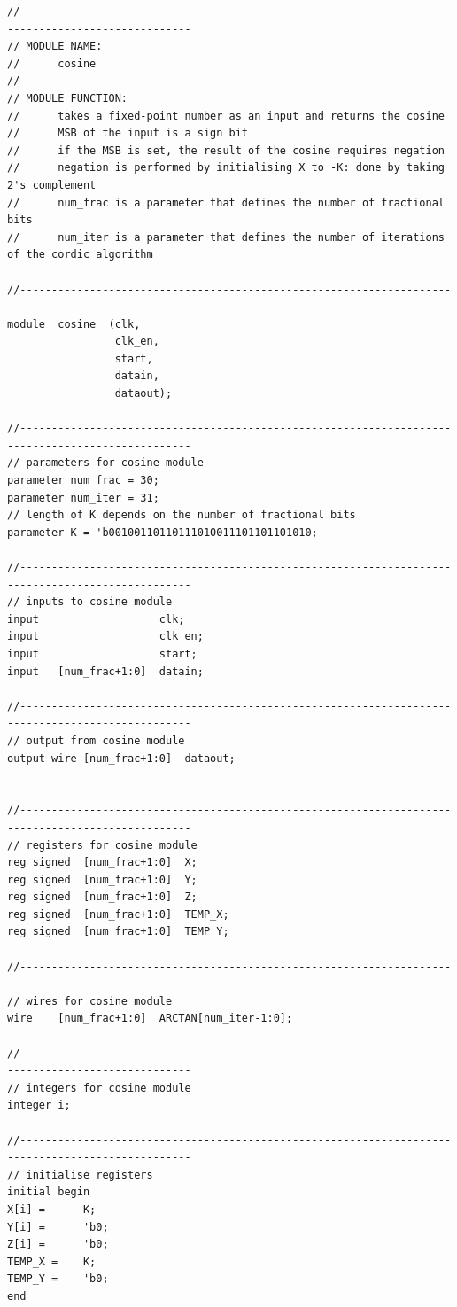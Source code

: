 \documentclass{article}
\begin{document}
\begin{verbatim}
//-------------------------------------------------------------------------------------------------
// MODULE NAME: 
//      cosine
//
// MODULE FUNCTION:
//      takes a fixed-point number as an input and returns the cosine
//      MSB of the input is a sign bit
//      if the MSB is set, the result of the cosine requires negation
//      negation is performed by initialising X to -K: done by taking 2's complement
//      num_frac is a parameter that defines the number of fractional bits
//      num_iter is a parameter that defines the number of iterations of the cordic algorithm

//-------------------------------------------------------------------------------------------------
module  cosine  (clk,
                 clk_en,                
                 start,
                 datain,
                 dataout);

//-------------------------------------------------------------------------------------------------
// parameters for cosine module
parameter num_frac = 30;
parameter num_iter = 31;
// length of K depends on the number of fractional bits
parameter K = 'b00100110110111010011101101101010;

//-------------------------------------------------------------------------------------------------
// inputs to cosine module				
input                   clk;
input                   clk_en;
input                   start;
input   [num_frac+1:0]  datain;

//-------------------------------------------------------------------------------------------------
// output from cosine module
output wire [num_frac+1:0]  dataout;


//-------------------------------------------------------------------------------------------------
// registers for cosine module
reg signed  [num_frac+1:0]  X;
reg signed  [num_frac+1:0]  Y;
reg signed  [num_frac+1:0]  Z;
reg signed  [num_frac+1:0]  TEMP_X;
reg signed  [num_frac+1:0]  TEMP_Y;

//-------------------------------------------------------------------------------------------------
// wires for cosine module
wire    [num_frac+1:0]  ARCTAN[num_iter-1:0];

//-------------------------------------------------------------------------------------------------
// integers for cosine module
integer i;

//-------------------------------------------------------------------------------------------------
// initialise registers
initial begin
X[i] =      K;
Y[i] =      'b0; 
Z[i] =      'b0;
TEMP_X =    K;
TEMP_Y =    'b0;
end


\end{verbatim}
\end{document}
